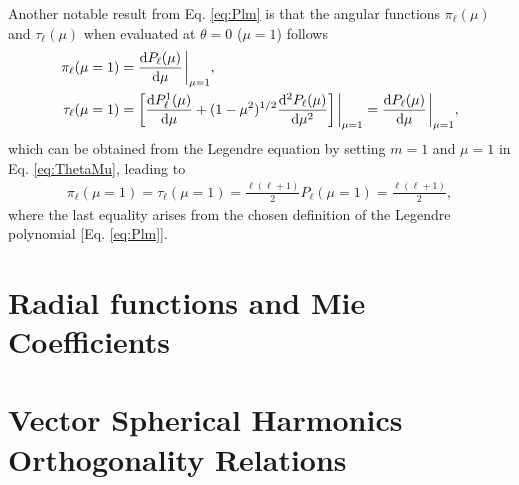 Another notable result from Eq. \eqref{eq:Plm} is that the angular functions $\pi_\ell(\mu)$ and $\tau_\ell(\mu)$ when evaluated at $\theta =0$ ($\mu = 1$)  follows 
%
\begin{align}
\pi_\ell(\mu=1) & =  \dv{P_\ell(\mu)}{\mu}\eval_{\mu=1},\\
\tau_\ell (\mu = 1) & = \qty[\dv{P_\ell^1(\mu)}{\mu} + (1-\mu^2)^{1/2}\dv[2]{P_\ell(\mu)}{\mu}]\eval_{\mu=1} = \dv{P_\ell(\mu)}{\mu}\eval_{\mu=1},
\end{align}
%
which can be obtained from the Legendre equation  by setting $m = 1$ and $\mu = 1$ in Eq. \eqref{eq:ThetaMu}, leading to
%
\begin{align}
\pi_\ell(\mu=1) = \tau_\ell(\mu=1) = \frac{\ell(\ell+1)}{2} P_\ell(\mu = 1) = \frac{\ell(\ell+1)}{2},
\end{align}
%
where the last equality arises from the chosen definition of the Legendre polynomial [Eq. \eqref{eq:Plm}].

	\section*{Radial functions and Mie Coefficients}










\section*{Vector Spherical Harmonics Orthogonality Relations}


